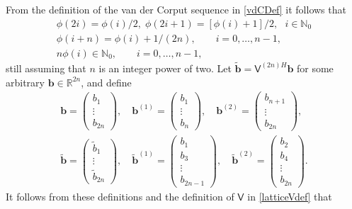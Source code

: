 \documentclass{iitthesis}          %
\newcommand{\bm}[1]{\boldsymbol{#1}}
\newcommand{\natzero}{\mathbb{N}_0}
\newcommand{\reals}{\mathbb{R}}
\newcommand{\vb}{\bm{b}}
\newcommand{\mV}{\mathsf{V}}
\begin{document}
From the definition of the van der Corput sequence in \eqref{vdCDef} it follows that
\begin{gather} 
\label{vdCProp}
\phi(2i) = \phi(i)/2, \;  \phi(2i+1) = [\phi(i)+1]/2, \ \ \ i \in \natzero\\
\label{vdCPropB}
\phi(i+n) = \phi(i) + 1/(2n), \qquad i = 0, \ldots, n-1,
\\
\label{vdCPropC}
n \phi(i) \in \natzero, \qquad i = 0, \ldots, n-1,
\end{gather}
still assuming that $n$ is an integer power of two.
Let $\widetilde{\vb} = \mV^{(2n)H}\vb$ for some arbitrary $\vb \in \reals^{2n}$, and define
\begin{gather*}
\vb = \begin{pmatrix} b_1 \\ \vdots \\ b_{2n} \end{pmatrix}, \quad 
\vb^{(1)} = \begin{pmatrix} b_1 \\ \vdots \\ b_{n} \end{pmatrix}, \quad 
\vb^{(2)}  = \begin{pmatrix} b_{n+1} \\ \vdots \\ b_{2n} \end{pmatrix}, \\ 
\widetilde{\vb} = \begin{pmatrix} \widetilde{b}_1 \\ \vdots \\ \widetilde{b}_{2n} \end{pmatrix}, \quad 
\widetilde{\vb}^{(1)} = \begin{pmatrix} b_1 \\ b_3 \\ \vdots \\ b_{2n-1} \end{pmatrix}, \quad 
\widetilde{\vb}^{(2)}  = \begin{pmatrix} b_{2} \\  b_{4} \\ \vdots \\ b_{2n} \end{pmatrix}. 
\end{gather*}
It follows from these definitions and the definition of $\mV$ in  \eqref{latticeVdef} that
\end{document}
